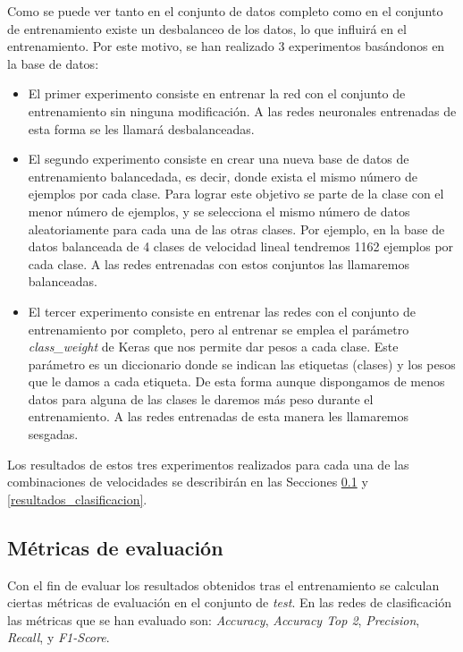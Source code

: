 Como se puede ver tanto en el conjunto de datos completo como en el conjunto de entrenamiento existe un desbalanceo de los datos, lo que influirá en el entrenamiento. Por este motivo, se han realizado 3 experimentos basándonos en la base de datos:\\

\begin{itemize}
    \item El primer experimento consiste en entrenar la red con el conjunto de entrenamiento sin ninguna modificación. A las redes neuronales entrenadas de esta forma se les llamará desbalanceadas.
    
    \item El segundo experimento consiste en crear una nueva base de datos de entrenamiento balancedada, es decir, donde exista el mismo número de ejemplos por cada clase. Para lograr este objetivo se parte de la clase con el menor número de ejemplos, y se selecciona el mismo número de datos aleatoriamente para cada una de las otras clases. Por ejemplo, en la base de datos balanceada de 4 clases de velocidad lineal tendremos 1162 ejemplos por cada clase. A las redes entrenadas con estos conjuntos las llamaremos balanceadas.
    
    \item El tercer experimento consiste en entrenar las redes con el conjunto de entrenamiento por completo, pero al entrenar se emplea el parámetro \textit{class\_weight} de Keras que nos permite dar pesos a cada clase. Este parámetro es un diccionario donde se indican las etiquetas (clases) y los pesos que le damos a cada etiqueta. De esta forma aunque dispongamos de menos datos para alguna de las clases le daremos más peso durante el entrenamiento. A las redes entrenadas de esta manera les llamaremos sesgadas.
\end{itemize}

Los resultados de estos tres experimentos realizados para cada una de las combinaciones de velocidades se describirán en las Secciones \ref{metrica_clasificacion} y \ref{resultados_clasificacion}.



\subsection{Métricas de evaluación}\label{metrica_clasificacion}

Con el fin de evaluar los resultados obtenidos tras el entrenamiento se calculan ciertas métricas de evaluación en el conjunto de \textit{test}. En las redes de clasificación las métricas que se han evaluado son: \textit{Accuracy}, \textit{Accuracy Top 2}, \textit{Precision}, \textit{Recall}, y \textit{F1-Score}.\\

